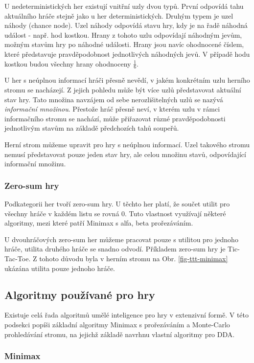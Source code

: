 U nedeterministických her existují vnitřní uzly dvou typů. První odpovídá tahu aktuálního hráče stejně jako u her deterministických. Druhým typem je uzel náhody (chance node). Uzel náhody odpovídá stavu hry, kdy je na řadě náhodná událost - např. hod kostkou. Hrany z tohoto uzlu odpovídají náhodným jevům, možným stavům hry po náhodné události. Hrany jsou navíc ohodnocené číslem, které představuje pravděpodobnost jednotlivých náhodných jevů. V případě hodu kostkou budou všechny hrany ohodnoceny $\frac{1}{6}$.

U her s neúplnou informací hráči přesně nevědí, v jakém konkrétním uzlu herního stromu se nacházejí. Z jejich pohledu může být více uzlů představovat aktuální stav hry. Tato množina navzájem od sebe nerozlišitelných uzlů se nazývá \emph{informační množinou}. Přestože hráč přesně neví, v kterém uzlu v rámci informačního stromu se nachází, může přiřazovat různé pravděpodobnosti jednotlivým stavům na základě předchozích tahů soupeřů.

Herní strom můžeme upravit pro hry s neúplnou informací. Uzel takového stromu nemusí představovat pouze jeden stav hry, ale celou množinu stavů, odpovídající informační množinu.

\subsubsection{Zero-sum hry}

Podkategorii her tvoří zero-sum hry. U těchto her platí, že součet utilit pro všechny hráče v každém listu se rovná 0. Tuto vlastnost využívají některé algoritmy, mezi které patří Minimax s alfa, beta prořezáváním.

U dvouhráčových zero-sum her můžeme pracovat pouze s utilitou pro jednoho hráče, utilita druhého hráče se snadno odvodí. Příkladem zero-sum hry je Tic-Tac-Toe. Z tohoto důvodu byla v herním stromu na Obr. \ref{fig-ttt-minimax} ukázána utilita pouze jednoho hráče.

\subsection{Algoritmy používané pro hry}

Existuje celá řada algoritmů umělé inteligence pro hry v extenzivní formě. V této podsekci popíši základní algoritmy Minimax s prořezáváním a Monte-Carlo prohledávání stromu, na jejichž základě navrhnu vlastní algoritmy pro DDA.

\subsubsection{Minimax}

